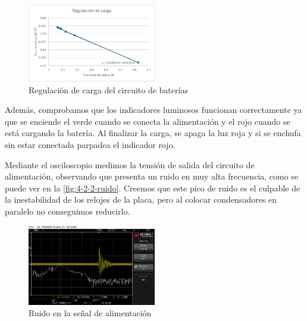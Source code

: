 \begin{figure}[h]
    \centering
    \includegraphics[width=0.5\textwidth]{images/4/4-2/regulacion-carga.png}
    \caption{Regulación de carga del circuito de baterías}
    \label{fig:4-2-2-regulacion-carga}
\end{figure}

Además, comprobamos que los indicadores luminosos funcionan correctamente ya que se enciende el verde cuando se conecta la alimentación y el rojo cuando se está cargando la batería. Al finalizar la carga, se apaga la luz roja y si se enchufa sin estar conectada parpadea el indicador rojo.

Mediante el osciloscopio medimos la tensión de salida del circuito de alimentación, observando que presenta un ruido en muy alta frecuencia, como se puede ver en la \autoref{fig:4-2-2-ruido}. Creemos que este pico de ruido es el culpable de la inestabilidad de los relojes de la placa, pero al colocar condensadores en paralelo no conseguimos reducirlo.

\begin{figure}[h]
    \centering
    \includegraphics[width=0.5\textwidth]{images/4/4-2/ruido.png}
    \caption{Ruido en la señal de alimentación}
    \label{fig:4-2-2-ruido}
\end{figure}